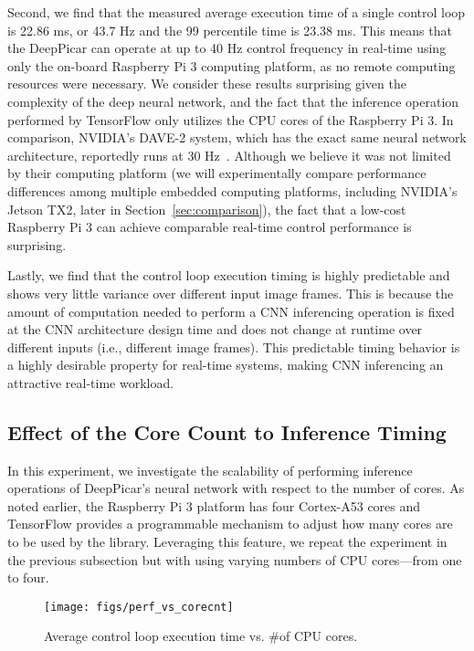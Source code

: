 Second, we find that the measured average
execution time of a single control loop is 22.86 ms, or 43.7 Hz and
the 99 percentile time is 23.38 ms.
This means that the DeepPicar can operate
at up to 40 Hz control frequency in real-time using only the on-board
Raspberry Pi 3 computing platform, as no remote computing resources
were necessary. We consider these results surprising given the complexity
of the deep neural network, and the fact that the inference operation
performed by TensorFlow only utilizes the CPU cores of the Raspberry Pi 3.
In comparison, NVIDIA's DAVE-2 system, which has the exact same neural
network architecture, reportedly runs at 30 Hz~\cite{Bojarski2016}.
Although we believe it was not
limited by their computing platform (we will experimentally compare
performance differences among multiple embedded computing platforms,
including NVIDIA's Jetson TX2, later in
Section~\ref{sec:comparison}), the fact that a low-cost
Raspberry Pi 3 can achieve comparable real-time control performance is
surprising.

Lastly, we find that the control loop execution timing is highly
predictable and shows very little variance over different input image
frames. This is because the amount of computation needed to perform
a CNN inferencing operation is fixed at the CNN architecture design
time and does not change at runtime over different inputs (i.e.,
different image frames). This predictable timing behavior is a highly
desirable property for real-time systems, making CNN inferencing an
attractive real-time workload.

\subsection{Effect of the Core Count to Inference Timing}

In this experiment, we investigate the scalability of performing
inference operations of DeepPicar's neural network with respect to the
number of cores. As noted earlier, the Raspberry Pi 3 platform has
four Cortex-A53 cores and TensorFlow
provides a programmable mechanism to adjust how many cores are to be
used by the library. Leveraging this feature, we repeat the
experiment in the previous subsection but with using varying
numbers of CPU cores---from one to four.

\begin{figure}[h]
  \centering
  \texttt{[image: figs/perf\_vs\_corecnt]}
  \caption{Average control loop execution time vs. \#of CPU
    cores.}
  \label{fig:perf-vs-corecnt}
\end{figure}

